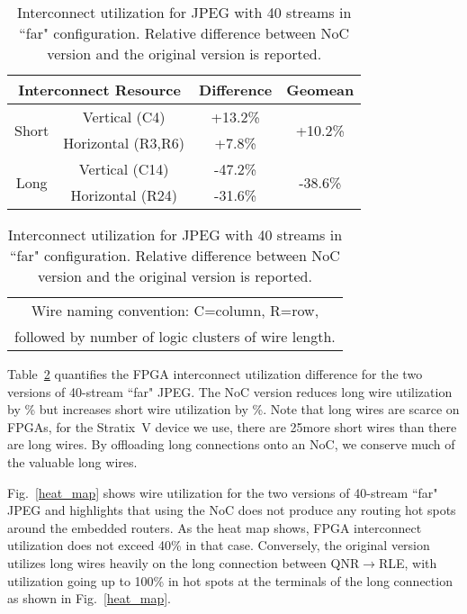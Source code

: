 %
\begin{table}[!t]
\centering
\begin{small}
    \caption{Interconnect utilization for JPEG with 40 streams in ``far" configuration. Relative difference between NoC version and the original version is reported.}
    \label{wire_util}
    \begin{tabular}{cccc}
    \toprule
    \multicolumn{2}{c}{Interconnect Resource}       & Difference & Geomean \\
    \midrule
	\multirow{2}{*}{Short}   & Vertical (C4)         & +13.2\%   & \multirow{2}{*}{+10.2\%} \\
	                         & Horizontal (R3,R6)   & +7.8\% & \\
	\midrule
	\multirow{2}{*}{Long} & Vertical (C14)           & -47.2\% & \multirow{2}{*}{-38.6\%}\\
	& Horizontal (R24)                              & -31.6\%  & \\
    \bottomrule
	\end{tabular}
    \begin{tabular}{cccc}
	\multicolumn{4}{c}{Wire naming convention: C=column, R=row, }\\
	\multicolumn{4}{c}{followed by number of logic clusters of wire length.}\\
    \end{tabular}
\end{small}
\end{table}
%

Table~\ref{wire_util} quantifies the FPGA interconnect utilization difference for the two versions of 40-stream ``far" JPEG.
The NoC version reduces long wire utilization by \% but increases short wire utilization by \%.
Note that long wires are scarce on FPGAs, for the Stratix~V device we use, there are 25\xx more short wires than there are long wires.
By offloading long connections onto an NoC, we conserve much of the valuable long wires.

%
%

Fig.~\ref{heat_map} shows wire utilization for the two versions of 40-stream ``far" JPEG and highlights that using the NoC does not produce any routing hot spots around the embedded routers.
As the heat map shows, FPGA interconnect utilization does not exceed 40\% in that case.
Conversely, the original version utilizes long wires heavily on the long connection between QNR$\rightarrow$RLE, with utilization going up to 100\% in hot spots at the terminals of the long connection as shown in Fig.~\ref{heat_map}.


%
%
